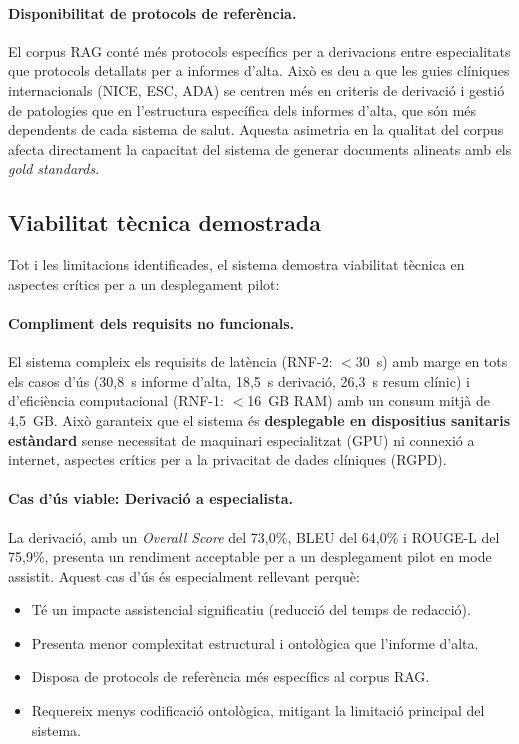 \documentclass[CAT]{TFUOC}%
\begin{document}
\paragraph{Disponibilitat de protocols de referència.}
El corpus RAG conté més protocols específics per a derivacions entre especialitats que protocols detallats per a informes d'alta. Això es deu a que les guies clíniques internacionals (NICE, ESC, ADA) se centren més en criteris de derivació i gestió de patologies que en l'estructura específica dels informes d'alta, que són més dependents de cada sistema de salut. Aquesta asimetria en la qualitat del corpus afecta directament la capacitat del sistema de generar documents alineats amb els \textit{gold standards}.

\subsection{Viabilitat tècnica demostrada}

Tot i les limitacions identificades, el sistema demostra viabilitat tècnica en aspectes crítics per a un desplegament pilot:

\paragraph{Compliment dels requisits no funcionals.}
El sistema compleix els requisits de latència (RNF-2: $<$30~s) amb marge en tots els casos d'ús (30,8~s informe d'alta, 18,5~s derivació, 26,3~s resum clínic) i d'eficiència computacional (RNF-1: $<$16~GB RAM) amb un consum mitjà de 4,5~GB. Això garanteix que el sistema és \textbf{desplegable en dispositius sanitaris estàndard} sense necessitat de maquinari especialitzat (GPU) ni connexió a internet, aspectes crítics per a la privacitat de dades clíniques (RGPD).

\paragraph{Cas d'ús viable: Derivació a especialista.}
La derivació, amb un \textit{Overall Score} del 73,0\%, BLEU del 64,0\% i ROUGE-L del 75,9\%, presenta un rendiment acceptable per a un desplegament pilot en mode assistit. Aquest cas d'ús és especialment rellevant perquè:
\begin{itemize}
    \item Té un impacte assistencial significatiu (reducció del temps de redacció).
    \item Presenta menor complexitat estructural i ontològica que l'informe d'alta.
    \item Disposa de protocols de referència més específics al corpus RAG.
    \item Requereix menys codificació ontològica, mitigant la limitació principal del sistema.
\end{itemize}
\end{document}
